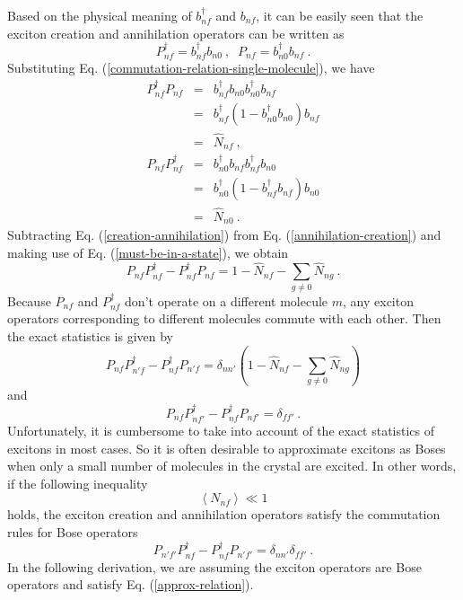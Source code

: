 Based on the physical meaning of $b_{nf}^{\dagger}$ and $b_{nf}$, it can be easily seen that the exciton creation and annihilation operators can be written as
\begin{equation}
P_{nf}^{\dagger} = b_{nf}^{\dagger} b_{n0} \ , \;\;P_{nf}=b_{n0}^{\dagger} b_{nf} \ . \label{creation&annihilation}
\end{equation}
Substituting Eq. (\ref{commutation-relation-single-molecule}), we have
\begin{eqnarray}
P_{nf}^{\dagger} P_{nf} &=& b_{nf}^{\dagger} b_{n0}b_{n0}^{\dagger} b_{nf} \nonumber \\
                                      &=& b_{nf}^{\dagger}(1-b_{n0}^{\dagger}b_{n0})b_{nf} \nonumber \\
                                      &=& \hat{N}_{nf} \ , \label{creation-annihilation}
\end{eqnarray}
\begin{eqnarray}
P_{nf} P_{nf}^{\dagger} &=& b_{n0}^{\dagger} b_{nf} b_{nf}^{\dagger} b_{n0} \nonumber \\
                                      &=& b_{n0}^{\dagger}(1-b_{nf}^{\dagger}b_{nf})b_{n0} \nonumber \\
                                      &=& \hat{N}_{n0} \ . \label{annihilation-creation}
\end{eqnarray}
Subtracting Eq. (\ref{creation-annihilation}) from Eq. (\ref{annihilation-creation}) and making use of Eq. (\ref{must-be-in-a-state}), we obtain
\begin{equation}
P_{nf} P_{nf}^{\dagger} - P_{nf}^{\dagger} P_{nf} = 1-\hat{N}_{nf} - \sum_{g\neq 0} \hat{N}_{ng}  \ . \label{exact-relation}
\end{equation}
Because $P_{nf}$ and $P_{nf}^{\dagger}$ don't operate on a different
molecule $m$, any exciton operators corresponding to different molecules
commute with each other. Then the exact statistics is given by 
\begin{equation}
P_{nf}P_{n'f}^{\dagger}-P_{nf}^{\dagger}P_{n'f}  =  \delta_{nn'}\left(1-\hat{N}_{nf}-\sum_{g\neq0}\hat{N}_{ng}\right)  \label{exact-relation2}
\end{equation}
and 
\begin{equation}
P_{nf}P_{nf'}^{\dagger}-P_{nf}^{\dagger}P_{nf'}=\delta_{ff'}\ . 
\end{equation}
Unfortunately, it is cumbersome to take into account of the exact
statistics of excitons in most cases. So it is often desirable to approximate excitons as Boses when only a small number of molecules in the crystal are excited. In other words, if the following inequality
\begin{equation}
\left\langle N_{nf} \right\rangle \ll 1 \label{condition-for-Bose-approx}
\end{equation}
holds, the exciton creation and annihilation operators satisfy the commutation rules for Bose operators
\begin{equation}
P_{n'f'}P_{nf}^{\dagger} - P_{nf}^{\dagger}P_{n'f'}=\delta_{nn'}\delta_{ff'} \ . \label{approx-relation}
\end{equation}
In the following derivation, we are assuming the exciton operators are Bose operators and satisfy Eq. (\ref{approx-relation}). 

